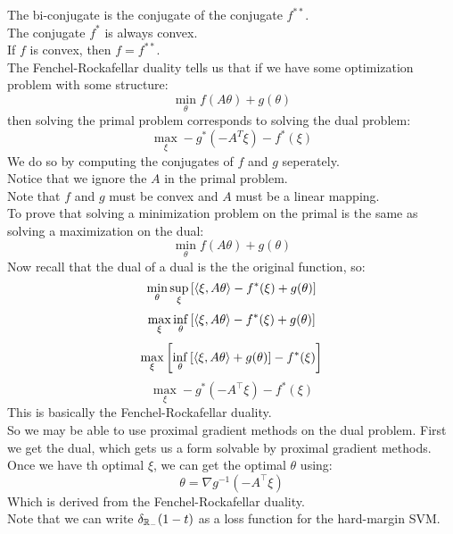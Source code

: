 \documentclass[12pt]{article}
\begin{document}
The bi-conjugate is the conjugate of the
conjugate $f^{**}$. \\

The conjugate $f^*$ is always convex. \\

If $f$ is convex, then $f = f^{**}$. \\

The Fenchel-Rockafellar duality tells
us that if we have some optimization problem
with some structure:
\[ \min_\theta f(A\theta) + g(\theta) \]
then solving the primal problem corresponds
to solving the dual problem:
\[ \max_\xi - g^*(-A^T\xi) - f^*(\xi) \]
We do so by computing the conjugates of $f$
and $g$ seperately. \\
Notice that we ignore the $A$
in the primal problem. \\
Note that $f$ and $g$ must be convex
and $A$ must be a linear mapping. \\

To prove that solving a minimization problem
on the primal is the same as solving a maximization
on the dual:
\[ \min_{\theta} f(A\theta) + g(\theta) \]
Now recall that the dual of a dual is the
the original function, so:
\[\min_{\theta} \sup_{\xi} \left[  \langle \xi, 
A\theta \rangle - f^*(\xi) + g(\theta) \right] \]
\[\max_{\xi}  \inf_{\theta}\left[  \langle \xi, 
A\theta \rangle - f^*(\xi) + g(\theta) \right] \]
\[\max_{\xi} \left[  \inf_{\theta} \left[  \langle \xi, 
A\theta \rangle + g(\theta) \right] - f^*(\xi) \right] \]
\[ \max_{\xi} - g^*(-A^\top \xi) - f^*(\xi) \]
This is basically the
Fenchel-Rockafellar duality. \\

So we may be able to use proximal gradient
methods on the dual problem.
First we get the dual, which 
gets us a form solvable by proximal gradient
methods. \\

Once we have th optimal $\xi$,
we can get the optimal $\theta$
using:
\[ \theta = \nabla g^{-1}(-A^\top \xi) \]
Which is derived from the 
Fenchel-Rockafellar duality. \\

Note that we can write $\delta_{\mathbb{R}_-}(1-t)$
as a loss function for the hard-margin SVM. \\
\end{document}
